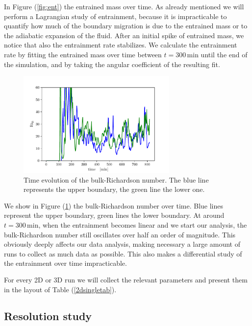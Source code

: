 In Figure (\ref{fig:ent}) the entrained mass over time. As already mentioned we will perform a Lagrangian study of entrainment, because it is impracticable to quantify how much of the boundary migration is due to the entrained mass or to the adiabatic expansion of the fluid. After an initial spike of entrained mass, we notice that also the entrainment rate stabilizes. We calculate the entrainment rate by fitting the entrained mass over time between $t = 300 \, \mathrm{min}$ until the end of the simulation, and by taking the angular coefficient of the resulting fit. 

\begin{figure}[t!]
\centering
\includegraphics[width=0.7\textwidth]{./img/bulk.pdf}
\caption{Time evolution of the bulk-Richardson number. The blue line represents the upper boundary, the green line the lower one.}
\label{fig:bulk}
\centering
\end{figure}
We show in Figure (\ref{fig:bulk}) the bulk-Richardson number over time. Blue lines represent the upper boundary, green lines the lower boundary. At around $t=\mathrm{300 \, min}$, when the entrainment becomes linear and we start our analysis, the bulk-Richardson number still oscillates over half an order of magnitude. This obviously deeply affects our data analysis, making necessary a large amount of runs to collect as much data as possible. This also makes a differential study of the entrainment over time impracticable. 

For every 2D or 3D run we will collect the relevant parameters and present them in the layout of Table (\ref{2dsingletab}).

\subsection{Resolution study}

